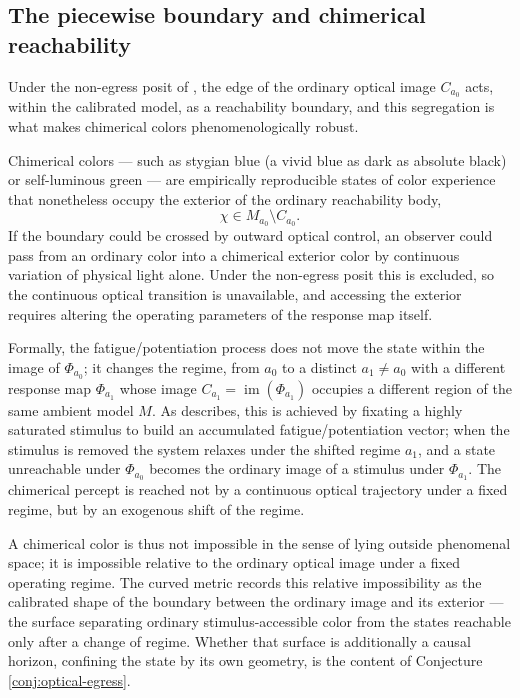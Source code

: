 \documentclass[preprint,12pt,authoryear]{elsarticle}
\theoremstyle{plain}
\theoremstyle{definition}
\theoremstyle{remark}
\begin{document}
\subsection{The piecewise boundary and chimerical reachability}
\label{subsec:piecewise-boundary-chimerical-reachability}

Under the non-egress posit of , the edge of the ordinary optical image $C_{a_0}$ acts, within the calibrated model, as a reachability boundary, and this segregation is what makes chimerical colors phenomenologically robust.

Chimerical colors --- such as stygian blue (a vivid blue as dark as absolute black) or self-luminous green \citep{Churchland2005} --- are empirically reproducible states of color experience that nonetheless occupy the exterior of the ordinary reachability body,
\[
\chi\in M_{a_0}\setminus C_{a_0}.
\]
If the boundary could be crossed by outward optical control, an observer could pass from an ordinary color into a chimerical exterior color by continuous variation of physical light alone. Under the non-egress posit this is excluded, so the continuous optical transition is unavailable, and accessing the exterior requires altering the operating parameters of the response map itself.

Formally, the fatigue/potentiation process does not move the state within the image of $\Phi_{a_0}$; it changes the regime, from $a_0$ to a distinct $a_1\neq a_0$ with a different response map $\Phi_{a_1}$ whose image $C_{a_1}=\operatorname{im}(\Phi_{a_1})$ occupies a different region of the same ambient model $M$. As \citet{Churchland2005} describes, this is achieved by fixating a highly saturated stimulus to build an accumulated fatigue/potentiation vector; when the stimulus is removed the system relaxes under the shifted regime $a_1$, and a state unreachable under $\Phi_{a_0}$ becomes the ordinary image of a stimulus under $\Phi_{a_1}$. The chimerical percept is reached not by a continuous optical trajectory under a fixed regime, but by an exogenous shift of the regime.

A chimerical color is thus not impossible in the sense of lying outside phenomenal space; it is impossible relative to the ordinary optical image under a fixed operating regime. The curved metric records this relative impossibility as the calibrated shape of the boundary between the ordinary image and its exterior --- the surface separating ordinary stimulus-accessible color from the states reachable only after a change of regime. Whether that surface is additionally a causal horizon, confining the state by its own geometry, is the content of Conjecture \ref{conj:optical-egress}.
\end{document}
